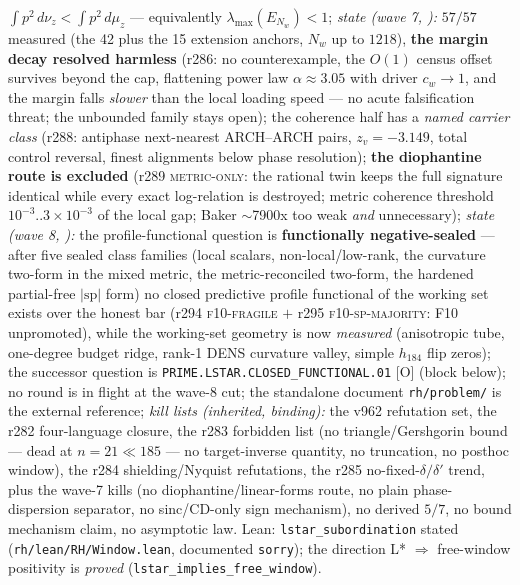 {$\int p^2\,d\nu_z < \int p^2\,d\mu_z$ --- equivalently
$\lambda_{\max}(E_{N_w}) < 1$; \emph{state (wave 7,
):} $57/57$ measured (the
42 plus the 15 extension anchors, $N_w$ up to $1218$), \textbf{the
margin decay resolved harmless} (r286: no counterexample, the
$O(1)$ census offset survives beyond the cap, flattening power
law $\alpha \approx 3.05$ with driver $c_w \to 1$, and the margin
falls \emph{slower} than the local loading speed --- no acute
falsification threat; the unbounded family stays open); the
coherence half has a \emph{named carrier class} (r288: antiphase
next-nearest ARCH--ARCH pairs, $z_v = -3.149$, total control
reversal, finest alignments below phase resolution); \textbf{the
diophantine route is excluded} (r289 \textsc{metric-only}: the
rational twin keeps the full signature identical while every
exact log-relation is destroyed; metric coherence threshold
$10^{-3}..3\times10^{-3}$ of the local gap; Baker $\sim$7900x too
weak \emph{and} unnecessary); \emph{state (wave 8,
):} the profile-functional
question is \textbf{functionally negative-sealed} --- after five
sealed class families (local scalars, non-local/low-rank, the
curvature two-form in the mixed metric, the metric-reconciled
two-form, the hardened partial-free $|\mathrm{sp}|$ form) no closed
predictive profile functional of the working set exists over the
honest bar (r294 \textsc{f10-fragile} $+$ r295
\textsc{f10-sp-majority}: F10 unpromoted), while the working-set
geometry is now \emph{measured} (anisotropic tube, one-degree
budget ridge, rank-1 DENS curvature valley, simple $h_{184}$ flip
zeros); the successor question is
\texttt{PRIME.LSTAR.\allowbreak CLOSED\_FUNCTIONAL.01} [O] (block
below); no round is in flight at the wave-8 cut; the
standalone document \texttt{rh/problem/} is the
external reference; \emph{kill lists (inherited, binding):} the
v962 refutation set, the r282 four-language closure, the r283
forbidden list (no triangle/Gershgorin bound --- dead at $n = 21
\ll 185$ --- no target-inverse quantity, no truncation, no
posthoc window), the r284 shielding/Nyquist refutations, the
r285 no-fixed-$\delta/\delta'$ trend, plus the wave-7 kills (no
diophantine/linear-forms route, no plain phase-dispersion
separator, no sinc/CD-only sign mechanism), no derived $5/7$, no
bound mechanism claim, no asymptotic law.  Lean:
\texttt{lstar\_subordination} stated
(\texttt{rh/lean/RH/Window.lean}, documented \texttt{sorry});
the direction L* $\Rightarrow$ free-window positivity is
\emph{proved} (\texttt{lstar\_implies\_free\_window}).
}
